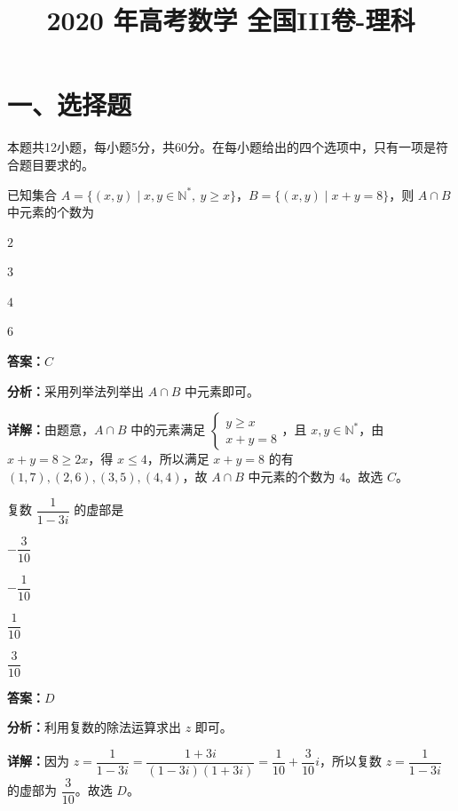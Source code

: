 ﻿\title{2020 年高考数学 全国III卷-理科}
\date{}
\maketitle

\section*{一、选择题}
本题共12小题，每小题5分，共60分。在每小题给出的四个选项中，只有一项是符合题目要求的。

\begin{question}[points=5]
已知集合 $A=\{(x,y)\mid x,y\in\mathbb{N}^*,\ y\ge x\}$，$B=\{(x,y)\mid x+y=8\}$，则 $A\cap B$ 中元素的个数为
\begin{choices}
  \item $2$
  \item $3$
  \item $4$
  \item $6$
\end{choices}
\begin{solution}
\textbf{答案：}$C$

\textbf{分析：}采用列举法列举出 $A\cap B$ 中元素即可。

\textbf{详解：}由题意，$A\cap B$ 中的元素满足 $\begin{cases} y\ge x \\ x+y=8 \end{cases}$，且 $x,y\in\mathbb{N}^*$，由 $x+y=8\ge 2x$，得 $x\le 4$，所以满足 $x+y=8$ 的有 $(1,7),(2,6),(3,5),(4,4)$，故 $A\cap B$ 中元素的个数为 $4$。故选 $C$。
\end{solution}
\end{question}

\begin{question}[points=5]
复数 $\dfrac{1}{1-3i}$ 的虚部是
\begin{choices}
  \item $-\dfrac{3}{10}$
  \item $-\dfrac{1}{10}$
  \item $\dfrac{1}{10}$
  \item $\dfrac{3}{10}$
\end{choices}
\begin{solution}
\textbf{答案：}$D$

\textbf{分析：}利用复数的除法运算求出 $z$ 即可。

\textbf{详解：}因为 $z=\dfrac{1}{1-3i}=\dfrac{1+3i}{(1-3i)(1+3i)}=\dfrac{1}{10}+\dfrac{3}{10}i$，所以复数 $z=\dfrac{1}{1-3i}$ 的虚部为 $\dfrac{3}{10}$。故选 $D$。
\end{solution}
\end{question}


